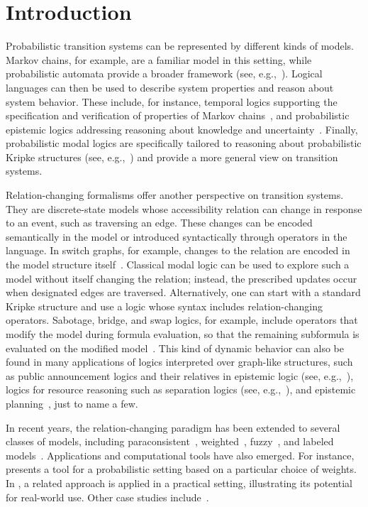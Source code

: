 \section{Introduction}

Probabilistic transition systems can be represented by different kinds of models. Markov chains, for example, are a familiar model in this setting, while probabilistic automata provide a broader framework (see, e.g.,~\cite{Segala95}). Logical languages can then be used to describe system properties and reason about system behavior. These include, for instance, temporal logics supporting the specification and verification of properties of Markov chains~\cite{Kwiatkowska2007}, and probabilistic epistemic logics addressing reasoning about knowledge and uncertainty~\cite{HT93}. Finally, probabilistic modal logics are specifically tailored to reasoning about probabilistic Kripke structures (see, e.g.,~\cite{ALDINI2024109167}) and provide a more general view on transition systems.

Relation-changing formalisms offer another perspective on transition systems. They are discrete-state models whose accessibility relation can change in response to an event, such as traversing an edge. These changes can be encoded semantically in the model or introduced syntactically through operators in the language. In switch graphs, for example, changes to the relation are encoded in the model structure itself~\cite{GabbayM12}. Classical modal logic can be used to explore such a model without itself changing the relation; instead, the prescribed updates occur when designated edges are traversed. Alternatively, one can start with a standard Kripke structure and use a logic whose syntax includes relation-changing operators. Sabotage, bridge, and swap logics, for example, include operators that modify the model during formula evaluation, so that the remaining subformula is evaluated on the modified model~\cite{ArecesFH15,Aucher&vanBenthem&Grossi18,Fervari14}.
This kind of dynamic behavior can also be found in many applications of logics interpreted over graph-like structures, such as public announcement logics and their relatives in epistemic logic (see, e.g.,~\cite{Plaza89:lopc,FervariV19}), logics for resource reasoning such as separation logics (see, e.g.,~\cite{OHearn19,DemriD15}), and epistemic planning~\cite{BolanderA11}, just to name a few.

In recent years, the relation-changing paradigm has been extended to several classes of models, including paraconsistent~\cite{CostaFM23}, weighted~\cite{FRMC19}, fuzzy~\cite{FFM25}, and labeled models~\cite{CFMS25,FMB18}. Applications and computational tools have also emerged. For instance, \cite{FRMC19} presents a tool for a probabilistic setting based on a particular choice of weights. In \cite{MFAPCB24}, a related approach is applied in a practical setting, illustrating its potential for real-world use. Other case studies include~\cite{FB18,SMF21}.

